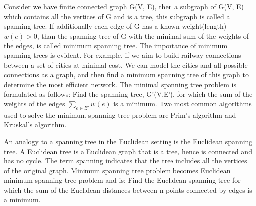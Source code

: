 \documentclass[openany]{book}
\begin{document}
	Consider we have finite connected graph G(V, E), then a subgraph of G(V, E) which contains all the vertices of G and is a tree, this subgraph is called a spanning tree. If additionally each edge of G has a known weight(length) \(w(e)>0\), than the spanning tree of G with the minimal sum of the weights of the edges, is called minimum spanning tree. The importance of minimum spanning trees is evident. For example, if we aim to build railway connections between a set of cities at minimal cost. We can model the cities and all possible connections as a graph, and then find a minimum spanning tree of this graph to determine the most efficient network. 
	The minimal spanning tree problem is formulated as follows: Find the spanning tree, G'(V,E'), for which the sum of the weights of the edges \( \sum_{e \in E'} w(e)\) is a minimum. Two most common algorithms used to solve the minimum spanning tree problem are Prim's algorithm and Kruskal's algorithm.
	
	An analogy to a spanning tree in the Euclidean setting is the Euclidean spanning tree. A Euclidean tree is a Euclidean graph that is a tree, hence is connected and has no cycle. The term spanning indicates that the tree includes all the vertices of the original graph. Minimum spanning tree problem becomes Euclidean minimum spanning tree problem and is: Find the Euclidean spanning tree for which the sum of the Euclidean distances between n points connected by edges is a minimum.   
	
\end{document}
